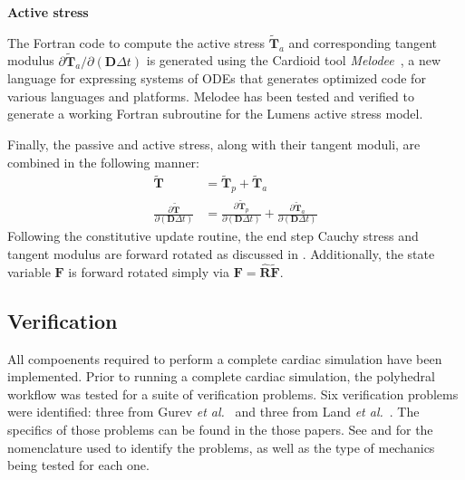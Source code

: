 \textbf{Active stress}

The Fortran code to compute the active stress $\tilde{\bm{T}}_a$ and corresponding tangent modulus ${\partial \tilde{\bm{T}}_a}/{\partial (\bm{D}\Delta{t})}$ is generated using the Cardioid tool \textit{Melodee}~\cite{melodee}, a new language for expressing systems of ODEs that generates optimized code for various languages and platforms. Melodee has been tested and verified to generate a working Fortran subroutine for the Lumens active stress model.

Finally, the passive and active stress, along with their tangent moduli, are combined in the following manner:
\begin{align}
\tilde{\bm{T}} &= \tilde{\bm{T}}_p + \tilde{\bm{T}}_a \\
\frac{\partial \tilde{\bm{T}}}{\partial (\bm{D}\Delta{t})} &= \frac{\partial \tilde{\bm{T}}_p}{\partial (\bm{D}\Delta{t})}+ \frac{\partial \tilde{\bm{T}}_a}{\partial (\bm{D}\Delta{t})}
\end{align}
Following the constitutive update routine, the end step Cauchy stress and tangent modulus are forward rotated as discussed in . Additionally, the state variable $\bm{F}$ is forward rotated simply via $\bm{F} =\hat{\bm{R}}\tilde{\bm{F}}$.


\subsection{Verification}

All compoenents required to perform a complete cardiac simulation have been implemented. Prior to running a complete cardiac simulation, the polyhedral workflow was tested for a suite of verification problems. Six verification problems were identified: three from Gurev \textit{et al.}~\cite{gurev_2015} and three from Land \textit{et al.}~\cite{land_2015}. The specifics of those problems can be found in the those papers. See  and  for the nomenclature used to identify the problems, as well as the type of mechanics being tested for each one.

